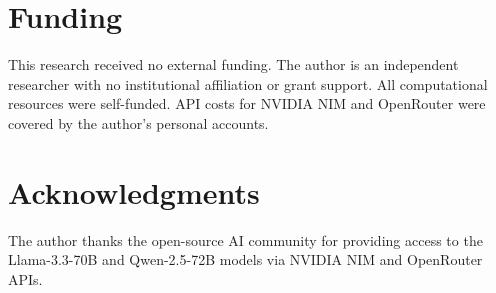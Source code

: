 \documentclass[lineno]{wlpeerj}
\begin{document}
\section*{Funding}

This research received no external funding. The author is an independent researcher with no institutional affiliation or grant support. All computational resources were self-funded. API costs for NVIDIA NIM and OpenRouter were covered by the author's personal accounts.

\section*{Acknowledgments}

The author thanks the open-source AI community for providing access to the Llama-3.3-70B and Qwen-2.5-72B models via NVIDIA NIM and OpenRouter APIs.


\end{document}
